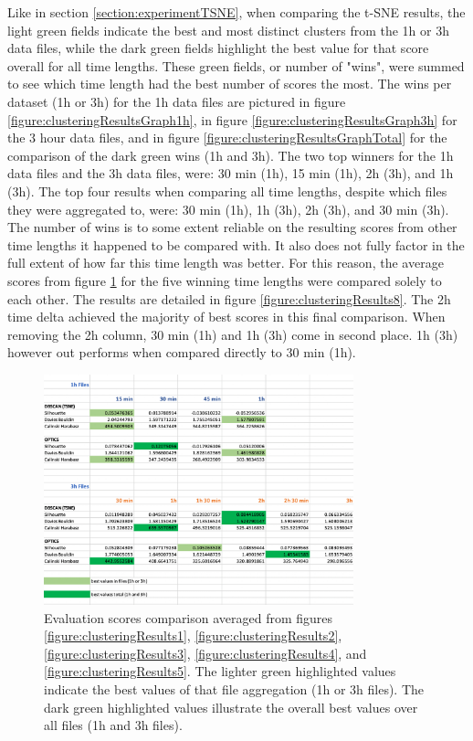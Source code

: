 Like in section \ref{section:experimentTSNE}, when comparing the t-SNE results, the light green fields indicate the best and most distinct clusters from the 1h or 3h data files, while the dark green fields highlight the best value for that score overall for all time lengths. These green fields, or number of "wins", were summed to see which time length had the best number of scores the most. The wins per dataset (1h or 3h) for the 1h data files are pictured in figure \ref{figure:clusteringResultsGraph1h}, in figure \ref{figure:clusteringResultsGraph3h} for the 3 hour data files, and in figure \ref{figure:clusteringResultsGraphTotal} for the comparison of the dark green wins (1h and 3h). The two top winners for the 1h data files and the 3h data files, were: 30 min (1h), 15 min (1h), 2h (3h), and 1h (3h). The top four results when comparing all time lengths, despite which files they were aggregated to, were: 30 min (1h), 1h (3h), 2h (3h), and 30 min (3h). The number of wins is to some extent reliable on the resulting scores from other time lengths it happened to be compared with. It also does not fully factor in the full extent of how far this time length was better. For this reason, the average scores from figure \ref{figure:clusteringResults6} for the five winning time lengths were compared solely to each other. The results are detailed in figure \ref{figure:clusteringResults8}. The 2h time delta achieved the majority of best scores in this final comparison. When removing the 2h column, 30 min (1h) and 1h (3h) come in second place. 1h (3h) however out performs when compared directly to 30 min (1h).

\begin{figure}
  \centering
  \includegraphics[width=0.8\textwidth]{./images/clusteringResults/clusteringResults6.png}
  \caption{Evaluation scores comparison averaged from figures \ref{figure:clusteringResults1}, \ref{figure:clusteringResults2}, \ref{figure:clusteringResults3}, \ref{figure:clusteringResults4}, and \ref{figure:clusteringResults5}. The lighter green highlighted values indicate the best values of that file aggregation (1h or 3h files). The dark green highlighted values illustrate the overall best values over all files (1h and 3h files).}
  \label{figure:clusteringResults6}
\end{figure}


